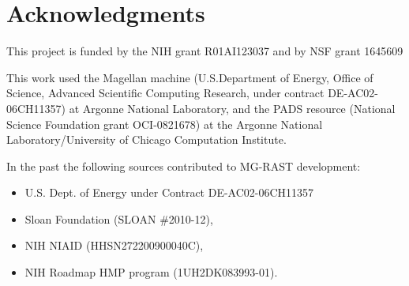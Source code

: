 \documentclass[12pt,fullpage]{report}
\begin{document}
\section*{Acknowledgments}

This project is funded by the NIH grant R01AI123037 and by NSF grant 1645609

This work used the Magellan machine (U.S.Department of Energy, Office of Science,
Advanced Scientific Computing Research, under contract  DE-AC02-06CH11357) at Argonne National Laboratory, and the PADS resource (National Science Foundation grant OCI-0821678) at the Argonne National Laboratory/University of Chicago Computation Institute.

In the past the following sources contributed to MG-RAST development:
\begin{itemize}
\item U.S. Dept. of Energy under Contract DE-AC02-06CH11357
\item Sloan Foundation (SLOAN \#2010-12),
\item NIH NIAID (HHSN272200900040C),
\item  NIH Roadmap HMP program (1UH2DK083993-01).
 \end{itemize}
\end{document}
